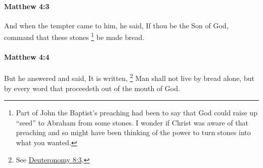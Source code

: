 		\paragraph{Matthew 4:3} %
			\label{MATTHEW-4-3}

			And when the tempter came to him, he said, If thou be the Son of God, command that these stones%
				\footnote{%
					Part of John the Baptist's preaching had been to say that God could raise up ``seed'' to Abraham from some stones. I wonder if Christ was aware of that preaching and so might have been thinking of the power to turn stones into what you wanted.
					}
			be made bread.

			\begin{framed}
			\scriptsize
				\begin{compactdesc}
					\item[SBLG] 
				\end{compactdesc}
			\end{framed}

		\paragraph{Matthew 4:4} %
			\label{MATTHEW-4-4}

			But he answered and said, It is written,%
			\footnote{%
				See \hyperref[DEUTERONOMY-8-3]{Deuteronomy 8:3}.
				} 
			Man shall not live by bread alone, but by every word that proceedeth out of the mouth of God.

